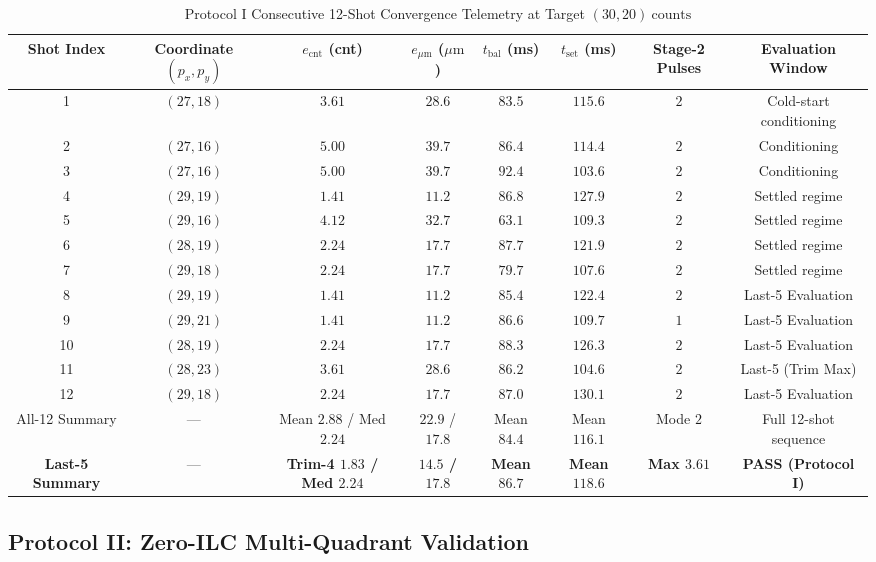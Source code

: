\documentclass[journal]{IEEEtran}
\begin{document}
\begin{table}[!t]
\centering
\caption{Protocol I Consecutive 12-Shot Convergence Telemetry at Target $(30, 20)\ \text{counts}$}
\label{tab:gate1}
\renewcommand{\arraystretch}{1.12}
\begin{tabular}{@{}cccccccc@{}}
\toprule
Shot Index & Coordinate $(p_x, p_y)$ & $e_{\text{cnt}}$ (cnt) & $e_{\mu\text{m}}$ ($\mu\text{m}$) & $t_{\text{bal}}$ (ms) & $t_{\text{set}}$ (ms) & Stage-2 Pulses & Evaluation Window \\
\midrule
1 & $(27, 18)$ & $3.61$ & $28.6$ & $83.5$ & $115.6$ & $2$ & Cold-start conditioning \\
2 & $(27, 16)$ & $5.00$ & $39.7$ & $86.4$ & $114.4$ & $2$ & Conditioning \\
3 & $(27, 16)$ & $5.00$ & $39.7$ & $92.4$ & $103.6$ & $2$ & Conditioning \\
4 & $(29, 19)$ & $1.41$ & $11.2$ & $86.8$ & $127.9$ & $2$ & Settled regime \\
5 & $(29, 16)$ & $4.12$ & $32.7$ & $63.1$ & $109.3$ & $2$ & Settled regime \\
6 & $(28, 19)$ & $2.24$ & $17.7$ & $87.7$ & $121.9$ & $2$ & Settled regime \\
7 & $(29, 18)$ & $2.24$ & $17.7$ & $79.7$ & $107.6$ & $2$ & Settled regime \\
8 & $(29, 19)$ & $1.41$ & $11.2$ & $85.4$ & $122.4$ & $2$ & Last-5 Evaluation \\
9 & $(29, 21)$ & $1.41$ & $11.2$ & $86.6$ & $109.7$ & $1$ & Last-5 Evaluation \\
10 & $(28, 19)$ & $2.24$ & $17.7$ & $88.3$ & $126.3$ & $2$ & Last-5 Evaluation \\
11 & $(28, 23)$ & $3.61$ & $28.6$ & $86.2$ & $104.6$ & $2$ & Last-5 (Trim Max) \\
12 & $(29, 18)$ & $2.24$ & $17.7$ & $87.0$ & $130.1$ & $2$ & Last-5 Evaluation \\
\midrule
All-12 Summary & --- & Mean $2.88$ / Med $2.24$ & $22.9$ / $17.8$ & Mean $84.4$ & Mean $116.1$ & Mode $2$ & Full 12-shot sequence \\
\textbf{Last-5 Summary} & --- & \textbf{Trim-4 $1.83$ / Med $2.24$} & \textbf{$14.5$ / $17.8$} & \textbf{Mean $86.7$} & \textbf{Mean $118.6$} & \textbf{Max $3.61$} & \textbf{PASS (Protocol I)} \\
\bottomrule
\end{tabular}
\end{table}

\subsection{Protocol II: Zero-ILC Multi-Quadrant Validation}
\end{document}
